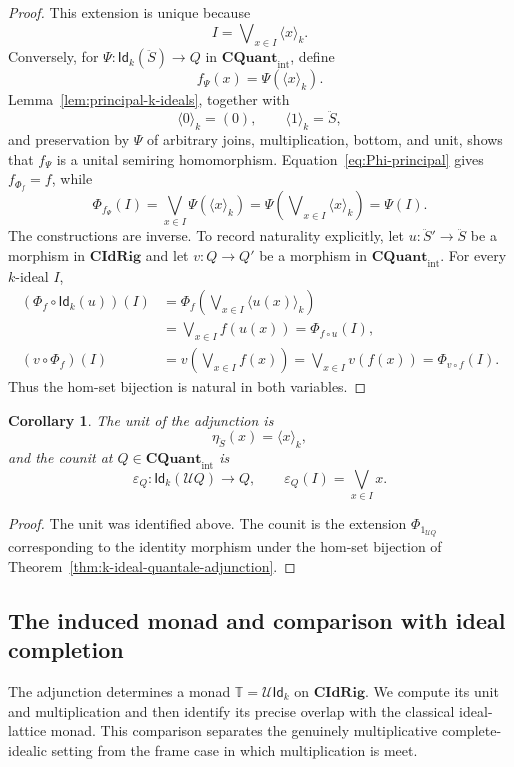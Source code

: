 \documentclass[12pt,leqno]{amsart}
\newcommand{\QuantTop}{\mathbf{CQuant}_{\mathrm{int}}}
\newcommand{\CIdRig}{\mathbf{CIdRig}}
\newcommand{\Idk}{\mathsf{Id}_{k}}
\newtheorem{corollary}[theorem]{Corollary}
\theoremstyle{definition}
\numberwithin{equation}{section}
\theoremstyle{remark}
\begin{document}
\begin{proof}
This extension is unique because
\[
I=\mathop{\bigvee{}^k}_{x\in I}\langle x\rangle_k.
\]
Conversely, for \(\Psi\colon\Idk(\ddot S)\to Q\) in \(\QuantTop\), define
\[
f_\Psi(x)=\Psi(\langle x\rangle_k).
\]
Lemma~\ref{lem:principal-k-ideals}, together with
\[
\langle0\rangle_k=(0),\qquad \langle1\rangle_k=\ddot S,
\]
and preservation by \(\Psi\) of arbitrary joins, multiplication, bottom, and unit, shows that \(f_\Psi\) is a unital semiring homomorphism. Equation~\eqref{eq:Phi-principal} gives \(f_{\Phi_f}=f\), while
\[
\Phi_{f_\Psi}(I)
 =\bigvee_{x\in I}\Psi(\langle x\rangle_k)
 =\Psi\left(\mathop{\bigvee{}^k}_{x\in I}\langle x\rangle_k\right)
 =\Psi(I).
\]
The constructions are inverse. To record naturality explicitly, let \(u\colon\ddot S'\to\ddot S\) be a morphism in \(\CIdRig\) and let \(v\colon Q\to Q'\) be a morphism in \(\QuantTop\). For every $k$-ideal $I$,
\begin{align*}
(\Phi_f\circ\Idk(u))(I)
 &=\Phi_f\left(\mathop{\bigvee{}^k}_{x\in I}\langle u(x)\rangle_k\right)\\
 &=\bigvee_{x\in I} f(u(x))
  =\Phi_{f\circ u}(I),\\
(v\circ\Phi_f)(I)
 &=v\left(\bigvee_{x\in I}f(x)\right)
  =\bigvee_{x\in I}v(f(x))
  =\Phi_{v\circ f}(I).
\end{align*}
Thus the hom-set bijection is natural in both variables.
\end{proof}

\begin{corollary}\label{cor:unit-counit}
The unit of the adjunction is
\[
\eta_{\ddot S}(x)=\langle x\rangle_k,
\]
and the counit at \(Q\in\QuantTop\) is
\[
\varepsilon_Q\colon\Idk(\mathcal UQ)\longrightarrow Q,
\qquad
\varepsilon_Q(I)=\bigvee_{x\in I}x.
\]
\end{corollary}

\begin{proof}
The unit was identified above. The counit is the extension \(\Phi_{1_{\mathcal UQ}}\) corresponding to the identity morphism under the hom-set bijection of Theorem~\ref{thm:k-ideal-quantale-adjunction}.
\end{proof}

\subsection{The induced monad and comparison with ideal completion}\label{subsec:induced-monad}

The adjunction determines a monad \(\mathbb T=\mathcal U\Idk\) on \(\CIdRig\). We compute its unit and multiplication and then identify its precise overlap with the classical ideal-lattice monad. This comparison separates the genuinely multiplicative complete-idealic setting from the frame case in which multiplication is meet.
\end{document}

